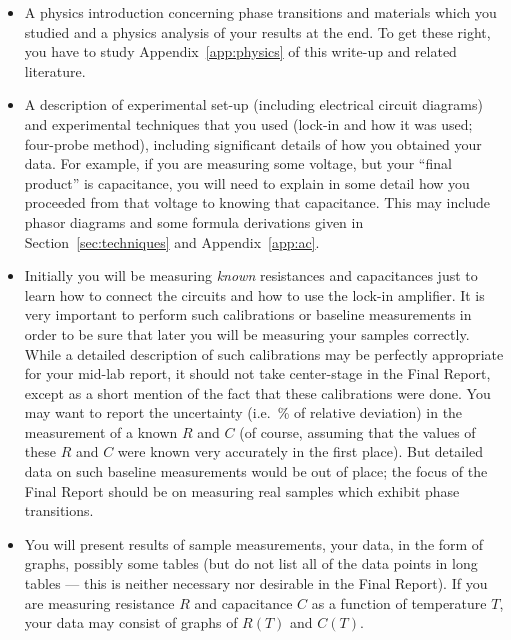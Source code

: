 \documentclass[11pt,a4paper]{article}
\begin{document}
\begin{itemize}
  \item A physics introduction concerning phase transitions and materials
        which you studied and a physics analysis of your results at the end. To
        get these right, you have to study Appendix~\ref{app:physics} of this
        write-up and related literature.

  \item A description of experimental set-up (including electrical circuit
        diagrams) and experimental techniques that you used (lock-in and how it
        was used; four-probe method), including significant details of how you
        obtained your data. For example, if you are measuring some voltage, but
        your ``final product'' is capacitance, you will need to
        explain in some detail how you proceeded from that voltage to knowing
        that capacitance. This may include phasor diagrams and some formula
        derivations given in Section~\ref{sec:techniques} and
        Appendix~\ref{app:ac}.

  \item Initially you will be measuring \emph{known} resistances and
        capacitances just to learn how to connect the circuits and how to use
        the lock-in amplifier. It is very important to perform such calibrations
        or baseline measurements in order to be sure that later you will be
        measuring your samples correctly. While a detailed description of such
        calibrations may be perfectly appropriate for your mid-lab report, it
        should not take center-stage in the Final Report, except as a short
        mention of the fact that these calibrations were done. You may want to
        report the uncertainty (i.e.\ \% of relative deviation) in the
        measurement of a known $R$ and $C$ (of course, assuming that the values
        of these $R$ and $C$ were known very accurately in the first place). But
        detailed data on such baseline measurements would be out of place; the
        focus of the Final Report should be on measuring real samples which
        exhibit phase transitions.

  \item You will present results of sample measurements, your data, in the form
        of graphs, possibly some tables (but do not list all of the data points
        in long tables --- this is neither necessary nor desirable in the Final
        Report). If you are measuring resistance $R$ and capacitance
        $C$ as a function of temperature $T$, your data may consist of graphs of
        $R(T)$ and $C(T)$.


\end{itemize}
\end{document}
